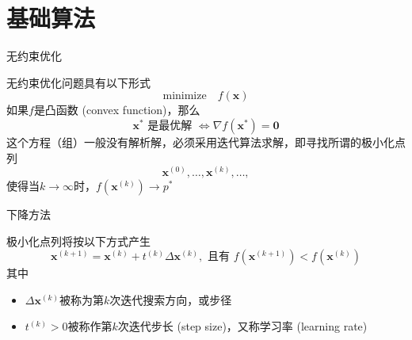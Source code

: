 
\section{基础算法}


\begin{frame}{无约束优化}

无约束优化问题具有以下形式
\[\text{minimize} \quad f(\mathbf{x})\]
如果$f$是凸函数 (convex function)，那么
\[\mathbf{x}^* \text{ 是最优解 } \Longleftrightarrow \nabla f(\mathbf{x}^*) = \mathbf{0}\]
这个方程（组）一般没有解析解，必须采用迭代算法求解，即寻找所谓的极小化点列
\[\mathbf{x}^{(0)}, \ldots, \mathbf{x}^{(k)}, \ldots,\]
使得当$k\to\infty$时，$f(\mathbf{x}^{(k)}) \to p^*$

\end{frame}


\begin{frame}{下降方法}

极小化点列将按以下方式产生
\[\mathbf{x}^{(k+1)} = \mathbf{x}^{(k)} + t^{(k)} \Delta \mathbf{x}^{(k)}, \text{ 且有 } f(\mathbf{x}^{(k+1)}) < f(\mathbf{x}^{(k)})\]
其中
\begin{itemize}
\item $\Delta \mathbf{x}^{(k)}$被称为第$k$次迭代搜索方向，或步径
\item $t^{(k)} > 0$被称作第$k$次迭代步长 (step size)，又称学习率 (learning rate)
\end{itemize}

\end{frame}



